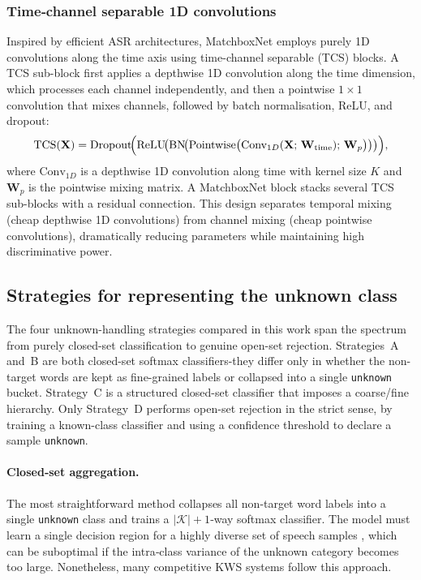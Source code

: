 \documentclass[11pt]{article}
\begin{document}
\subsubsection{Time‑channel separable 1D convolutions}
Inspired by efficient ASR architectures, MatchboxNet \cite{matchbox} employs purely 1D convolutions along the time axis using time-channel separable (TCS) blocks.
A TCS sub-block first applies a depthwise 1D convolution along the time dimension, which processes each channel independently, and then a pointwise $1\times1$ convolution that mixes channels, followed by batch normalisation, ReLU, and dropout:
\begin{equation}
    \text{TCS}(\mathbf{X}) = \text{Dropout}\!\Bigl(\text{ReLU}\!\bigl(\text{BN}\!\bigl(\text{Pointwise}\bigl(\text{Conv}_{1D}(\mathbf{X};\,\mathbf{W}_{\text{time}});\, \mathbf{W}_p\bigr)\bigr)\bigr)\Bigr),
\end{equation}
where $\text{Conv}_{1D}$ is a depthwise 1D convolution along time with kernel size $K$ and $\mathbf{W}_p$ is the pointwise mixing matrix.
A MatchboxNet block stacks several TCS sub-blocks with a residual connection.
This design separates temporal mixing (cheap depthwise 1D convolutions) from channel mixing (cheap pointwise convolutions), dramatically reducing parameters while maintaining high discriminative power.

\subsection{Strategies for representing the unknown class}
The four unknown-handling strategies compared in this work span the spectrum from purely closed-set classification to genuine open-set rejection.
Strategies~A and~B are both closed-set softmax classifiers-they differ only in whether the non-target words are kept as fine-grained labels or collapsed into a single \texttt{unknown} bucket.
Strategy~C is a structured closed-set classifier that imposes a coarse/fine hierarchy.
Only Strategy~D performs open-set rejection in the strict sense, by training a known-class classifier and using a confidence threshold to declare a sample \texttt{unknown}.

\paragraph{Closed‑set aggregation.}
The most straightforward method collapses all non‑target word labels into a single \texttt{unknown} class and trains a $|\mathcal{K}|+1$‑way softmax classifier.
The model must learn a single decision region for a highly diverse set of speech samples , which can be suboptimal if the intra‑class variance of the unknown category becomes too large. 
Nonetheless, many competitive KWS systems \cite{bcresnet,kwt,matchbox} follow this approach.
\end{document}

